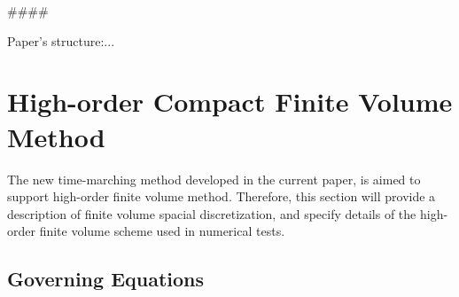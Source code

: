 \documentclass[preprint,12pt]{elsarticle}
\begin{document}
\#\#\#\#

Paper's structure:...%

\section{High-order Compact Finite Volume Method}
\label{sec:CFV}

\newcommand{\U}{\mathbf{U}}
\newcommand{\F}{\mathbf{F}}
\newcommand{\x}{\mathbf{x}}

The new time-marching method developed in
the current paper, is aimed to support
high-order finite volume method.
Therefore,
this section will provide a description of
finite volume spacial discretization,
and specify details
of the high-order finite volume scheme
used in numerical tests.

\subsection{Governing Equations}
\label{ssec:GovEq}
\end{document}
